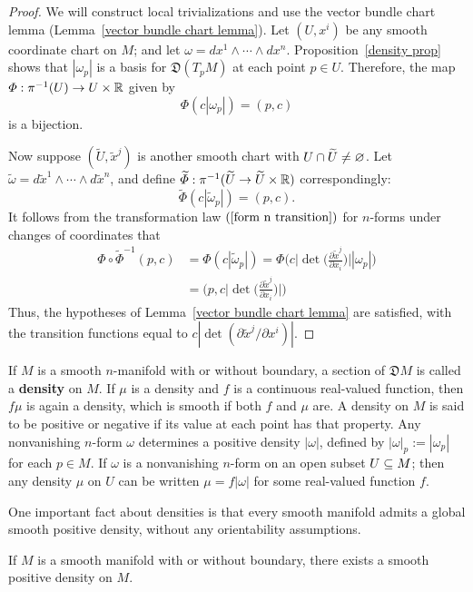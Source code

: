 \begin{proof}
We will construct local trivializations and use the vector bundle chart lemma (Lemma~\ref{vector bundle chart lemma}). Let $(U,x^i)$ be any smooth 
coordinate chart on $M$; and let $\omega=dx^1\wedge\cdots\wedge dx^n$. Proposition~\ref{density prop} shows that $|\omega_p|$ is a basis for $\mathfrak{D}(T_pM)$ at 
each point $p\in U$. Therefore, the map $\varPhi:\pi^{-1}(U)\to U\times\mathbb{R}$ given by
\[\varPhi(c|\omega_p|)=(p,c)\]
is a bijection.\par
Now suppose $(\widetilde{U},\widetilde{x}^j)$ is another smooth chart with $U\cap\widetilde{U}\neq\varnothing$. Let 
$\widetilde{\omega}=d\widetilde{x}^1\wedge\cdots\wedge d\widetilde{x}^n$, and define $\widetilde{\varPhi}:\pi^{-1}(\widetilde{U}\to\widetilde{U}\times\mathbb{R})$ 
correspondingly:
\[\widetilde{\varPhi}(c|\widetilde{\omega}_p|)=(p,c).\]
It follows from the transformation law $(\ref{form n transition})$ for $n$-forms under changes of coordinates that
\begin{align*}
\varPhi\circ\widetilde{\varPhi}^{-1}(p,c)&=\varPhi(c|\widetilde{\omega}_p|)=\varPhi\Big(c\Big|\det\Big(\frac{\partial\widetilde{x}^j}{\partial x_i}\Big)\Big||\omega_p|\Big)\\
&=\Big(p,c\Big|\det\Big(\frac{\partial\widetilde{x}^j}{\partial x_i}\Big)\Big|\Big)
\end{align*}
Thus, the hypotheses of Lemma~\ref{vector bundle chart lemma} are satisfied, with the transition functions equal
to $c|\det(\partial\widetilde{x}^j/\partial x^i)|$.
\end{proof}
If $M$ is a smooth $n$-manifold with or without boundary, a section of $\mathfrak{D}M$ is called a \textbf{density} on $M$. If $\mu$ is
a density and $f$ is a continuous real-valued function, then $f\mu$ is again a density, which is smooth if both $f$ and $\mu$ are. A density 
on $M$ is said to be positive or negative if its value at each point has that property. Any nonvanishing $n$-form $\omega$ determines a positive 
density $|\omega|$, defined by $|\omega|_p:=|\omega_p|$ for each $p\in M$. If $\omega$ is a nonvanishing $n$-form on an open subset $U\subseteq M$; 
then any density $\mu$ on $U$ can be written $\mu=f|\omega|$ for some real-valued function $f$.\par
One important fact about densities is that every smooth manifold admits a global smooth positive density, without any orientability assumptions.
\begin{proposition}
If $M$ is a smooth manifold with or without boundary, there exists a smooth positive density on $M$.
\end{proposition}
